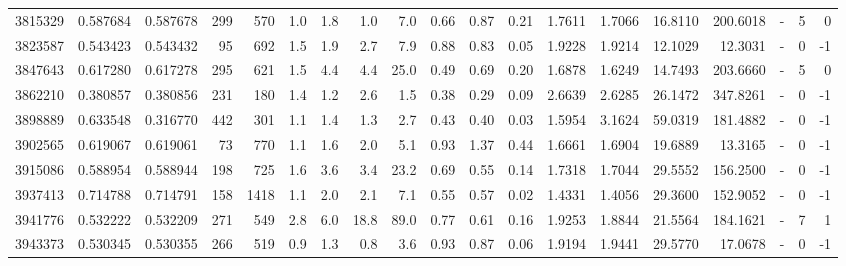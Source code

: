 \begin{tabular}{rrrrrrrrrrrrrrrrlrr}
   3815329 & 0.587684 &   0.587678 &  299 &  570 &      1.0 &      1.8 &     1.0 &      7.0 &       0.66 &        0.87 &        0.21 &  1.7611 &  1.7066 &   16.8110 &  200.6018 &             - &        5 &          0 \\
   3823587 & 0.543423 &   0.543432 &   95 &  692 &      1.5 &      1.9 &     2.7 &      7.9 &       0.88 &        0.83 &        0.05 &  1.9228 &  1.9214 &   12.1029 &   12.3031 &             - &        0 &         -1 \\
   3847643 & 0.617280 &   0.617278 &  295 &  621 &      1.5 &      4.4 &     4.4 &     25.0 &       0.49 &        0.69 &        0.20 &  1.6878 &  1.6249 &   14.7493 &  203.6660 &             - &        5 &          0 \\
   3862210 & 0.380857 &   0.380856 &  231 &  180 &      1.4 &      1.2 &     2.6 &      1.5 &       0.38 &        0.29 &        0.09 &  2.6639 &  2.6285 &   26.1472 &  347.8261 &             - &        0 &         -1 \\
   3898889 & 0.633548 &   0.316770 &  442 &  301 &      1.1 &      1.4 &     1.3 &      2.7 &       0.43 &        0.40 &        0.03 &  1.5954 &  3.1624 &   59.0319 &  181.4882 &             - &        0 &         -1 \\
   3902565 & 0.619067 &   0.619061 &   73 &  770 &      1.1 &      1.6 &     2.0 &      5.1 &       0.93 &        1.37 &        0.44 &  1.6661 &  1.6904 &   19.6889 &   13.3165 &             - &        0 &         -1 \\
   3915086 & 0.588954 &   0.588944 &  198 &  725 &      1.6 &      3.6 &     3.4 &     23.2 &       0.69 &        0.55 &        0.14 &  1.7318 &  1.7044 &   29.5552 &  156.2500 &             - &        0 &         -1 \\
   3937413 & 0.714788 &   0.714791 &  158 & 1418 &      1.1 &      2.0 &     2.1 &      7.1 &       0.55 &        0.57 &        0.02 &  1.4331 &  1.4056 &   29.3600 &  152.9052 &             - &        0 &         -1 \\
   3941776 & 0.532222 &   0.532209 &  271 &  549 &      2.8 &      6.0 &    18.8 &     89.0 &       0.77 &        0.61 &        0.16 &  1.9253 &  1.8844 &   21.5564 &  184.1621 &             - &        7 &          1 \\
   3943373 & 0.530345 &   0.530355 &  266 &  519 &      0.9 &      1.3 &     0.8 &      3.6 &       0.93 &        0.87 &        0.06 &  1.9194 &  1.9441 &   29.5770 &   17.0678 &             - &        0 &         -1 \\

\end{tabular}
